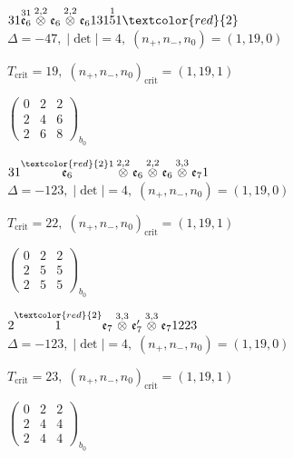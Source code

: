 \documentclass[10pt]{article}
\begin{document}
$31\overset{31}{\mathfrak{e}_6}\overset{2,2}{\otimes}\mathfrak{e}_6\overset{2,2}{\otimes}\mathfrak{e}_6131\overset{1}{5}1\textcolor{red}{2}$ \quad $\Delta=-47,\; |\det|=4,\; (n_+,n_-,n_0)=(1,19,0)$

\hspace{1em}$T_{\text{crit}}=19,\; (n_+,n_-,n_0)_{\text{crit}}=(1,19,1)$

\hspace{2em}$\left(\begin{smallmatrix}0 & 2 & 2 \\ 2 & 4 & 6 \\ 2 & 6 & 8\end{smallmatrix}\right)_{\!b_0}$

\smallskip

$31\overset{\textcolor{red}{2}1}{\mathfrak{e}_6}\overset{2,2}{\otimes}\mathfrak{e}_6\overset{2,2}{\otimes}\mathfrak{e}_6\overset{3,3}{\otimes}\mathfrak{e}_71$ \quad $\Delta=-123,\; |\det|=4,\; (n_+,n_-,n_0)=(1,19,0)$

\hspace{1em}$T_{\text{crit}}=22,\; (n_+,n_-,n_0)_{\text{crit}}=(1,19,1)$

\hspace{2em}$\left(\begin{smallmatrix}0 & 2 & 2 \\ 2 & 5 & 5 \\ 2 & 5 & 5\end{smallmatrix}\right)_{\!b_0}$

\smallskip

$2\overset{\textcolor{red}{2}}{1}\mathfrak{e}_7\overset{3,3}{\otimes}\mathfrak{e}_7'\overset{3,3}{\otimes}\mathfrak{e}_71223$ \quad $\Delta=-123,\; |\det|=4,\; (n_+,n_-,n_0)=(1,19,0)$

\hspace{1em}$T_{\text{crit}}=23,\; (n_+,n_-,n_0)_{\text{crit}}=(1,19,1)$

\hspace{2em}$\left(\begin{smallmatrix}0 & 2 & 2 \\ 2 & 4 & 4 \\ 2 & 4 & 4\end{smallmatrix}\right)_{\!b_0}$
\end{document}
